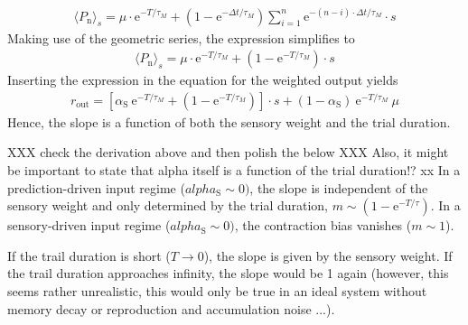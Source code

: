 \documentclass[10pt,a4paper,draft]{article}
\begin{document}
%
\begin{align}
\langle P_\mathrm{n} \rangle_s = \mu \cdot \mathrm{e}^{-T/\tau_M} + \left( 1 -   \mathrm{e}^{-\Delta t/\tau_M} \right) \sum_{i=1}^{n} \mathrm{e}^{-(n-i)\cdot \Delta t/ \tau_M} \cdot s
\end{align}
%
Making use of the geometric series, the expression simplifies to
%
\begin{align*}
\langle P_\mathrm{n} \rangle_s =  \mu \cdot \mathrm{e}^{-T/\tau_M} + \left( 1 -   \mathrm{e}^{-T/\tau_M} \right) \cdot s
\end{align*}
%
Inserting the expression in the equation for the weighted output yields
%
\begin{align*}
 r_\mathrm{out} = \left[ \alpha_\mathrm{S}\  \mathrm{e}^{-T/\tau_M} + \left( 1 -   \mathrm{e}^{-T/\tau_M} \right)\right] \cdot s + \left( 1 -\alpha_\mathrm{S} \right)\ \mathrm{e}^{-T/\tau_M}\ \mu
\end{align*}
%
Hence, the slope is a function of both the sensory weight and the trial duration. 
 
XXX check the derivation above and then polish the below XXX Also, it might be important to state that alpha itself is a function of the trial duration!? xx
In a prediction-driven input regime ($alpha_\mathrm{S} \sim 0)$, the slope is independent of the sensory weight and only determined by the trial duration, $m \sim \left( 1 -   \mathrm{e}^{-T/\tau} \right)$. In a sensory-driven input regime ($alpha_\mathrm{S} \sim 0)$, the contraction bias vanishes ($m \sim 1$). 

If the trail duration is short ($T \rightarrow 0$), the slope is given by the sensory weight. If the trail duration approaches infinity, the slope would be 1 again (however, this seems rather unrealistic, this would only be true in an ideal system without memory decay or reproduction and accumulation noise ...).


%
%
%
\end{document}
